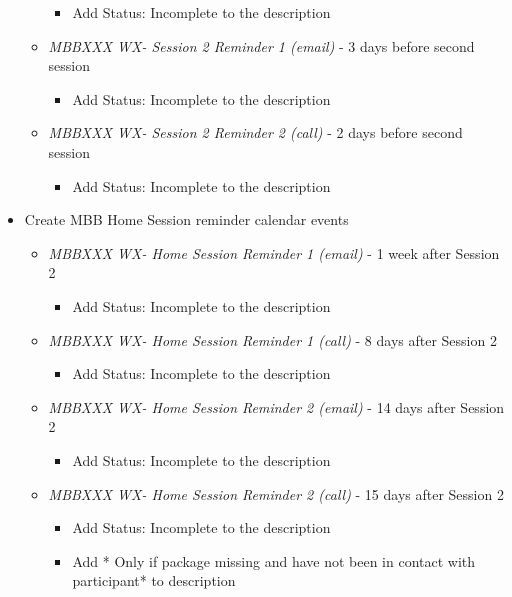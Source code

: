 \documentclass[]{book}
\providecommand{\tightlist}{%
  \setlength{\itemsep}{0pt}\setlength{\parskip}{0pt}}
\begin{document}
\begin{itemize}
\begin{itemize}
    \begin{itemize}
    \tightlist
    \item
      Add Status: Incomplete to the description
    \end{itemize}
  \item
    \emph{MBBXXX WX- Session 2 Reminder 1 (email) } - 3 days before second session

    \begin{itemize}
    \tightlist
    \item
      Add Status: Incomplete to the description
    \end{itemize}
  \item
    \emph{MBBXXX WX- Session 2 Reminder 2 (call)} - 2 days before second session

    \begin{itemize}
    \tightlist
    \item
      Add Status: Incomplete to the description
    \end{itemize}
  \end{itemize}
\item
  Create MBB Home Session reminder calendar events

  \begin{itemize}
  \tightlist
  \item
    \emph{MBBXXX WX- Home Session Reminder 1 (email)} - 1 week after Session 2

    \begin{itemize}
    \tightlist
    \item
      Add Status: Incomplete to the description
    \end{itemize}
  \item
    \emph{MBBXXX WX- Home Session Reminder 1 (call)} - 8 days after Session 2

    \begin{itemize}
    \tightlist
    \item
      Add Status: Incomplete to the description
    \end{itemize}
  \item
    \emph{MBBXXX WX- Home Session Reminder 2 (email)} - 14 days after Session 2

    \begin{itemize}
    \tightlist
    \item
      Add Status: Incomplete to the description
    \end{itemize}
  \item
    \emph{MBBXXX WX- Home Session Reminder 2 (call)} - 15 days after Session 2

    \begin{itemize}
    \tightlist
    \item
      Add Status: Incomplete to the description
    \item
      Add * Only if package missing and have not been in contact with participant* to description
    \end{itemize}
  \end{itemize}
\end{itemize}
\end{document}
